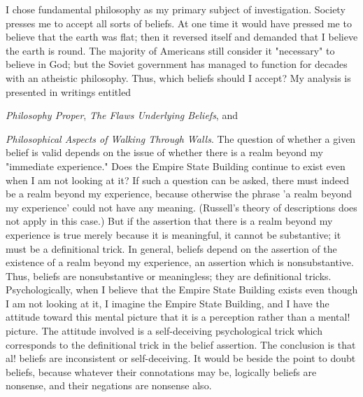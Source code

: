 \documentclass[10pt,twoside,draft]{memoir}
\newcommand{\essaytitle}[1]{
	\emph{#1}}
\begin{document}
I chose fundamental philosophy as my primary subject of investigation. 
Society presses me to accept all sorts of beliefs. At one time it would have 
pressed me to believe that the earth was flat; then it reversed itself and 
demanded that I believe the earth is round. The majority of Americans still 
consider it "necessary" to believe in God; but the Soviet government has 
managed to function for decades with an atheistic philosophy. Thus, which 
beliefs should I accept? My analysis is presented in writings entitled 
\essaytitle{Philosophy Proper}, \essaytitle{The Flaws Underlying Beliefs}, and 
\essaytitle{Philosophical Aspects of Walking Through Walls}. 
The question of whether a given belief is valid 
depends on the issue of whether there is a realm beyond my "immediate 
experience." Does the Empire State Building continue to exist even when I 
am not looking at it? If such a question can be asked, there must indeed be 
a realm beyond my experience, because otherwise the phrase 'a realm 
beyond my experience' could not have any meaning. (Russell's theory of 
descriptions does not apply in this case.) But if the assertion that there is a 
realm beyond my experience is true merely because it is meaningful, it 
cannot be substantive; it must be a definitional trick. In general, beliefs 
depend on the assertion of the existence of a realm beyond my experience, 
an assertion which is nonsubstantive. Thus, beliefs are nonsubstantive or 
meaningless; they are definitional tricks. Psychologically, when I believe that 
the Empire State Building exists even though I am not looking at it, I 
imagine the Empire State Building, and I have the attitude toward this 
mental picture that it is a perception rather than a mental! picture. The 
attitude involved is a self-deceiving psychological trick which corresponds to 
the definitional trick in the belief assertion. The conclusion is that al! beliefs 
are inconsistent or self-deceiving. It would be beside the point to doubt 
beliefs, because whatever their connotations may be, logically beliefs are 
nonsense, and their negations are nonsense also. 
\end{document}
